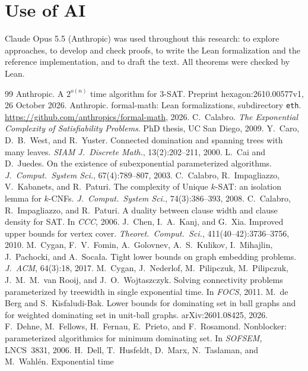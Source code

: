 \documentclass[11pt]{article}
\theoremstyle{remark}
\begin{document}
\section*{Use of AI}

Claude Opus 5.5 (Anthropic) was used throughout this research: to explore approaches, to develop
and check proofs, to write the Lean formalization and the reference implementation, and to draft
the text. All theorems were checked by Lean.

\begin{thebibliography}{99}
 Anthropic. A $2^{o(n)}$ time algorithm for 3-SAT. Preprint hexagon:2610.00577v1,
  26 October 2026.
 Anthropic. formal-math: Lean formalizations, subdirectory \texttt{eth}.
  \url{https://github.com/anthropics/formal-math}, 2026.
 C.~Calabro. \emph{The Exponential Complexity of Satisfiability Problems}.
  PhD thesis, UC San Diego, 2009.
 Y.~Caro, D.~B.~West, and R.~Yuster. Connected domination and spanning trees with
  many leaves. \emph{SIAM J.\ Discrete Math.}, 13(2):202--211, 2000.
 L.~Cai and D.~Juedes. On the existence of subexponential parameterized algorithms.
  \emph{J.\ Comput.\ System Sci.}, 67(4):789--807, 2003.
 C.~Calabro, R.~Impagliazzo, V.~Kabanets, and R.~Paturi. The complexity of Unique
  $k$-SAT: an isolation lemma for $k$-CNFs. \emph{J.\ Comput.\ System Sci.}, 74(3):386--393, 2008.
 C.~Calabro, R.~Impagliazzo, and R.~Paturi. A duality between clause width and
  clause density for SAT. In \emph{CCC}, 2006.
 J.~Chen, I.~A.~Kanj, and G.~Xia. Improved upper bounds for vertex cover.
  \emph{Theoret.\ Comput.\ Sci.}, 411(40--42):3736--3756, 2010.
 M.~Cygan, F.~V.~Fomin, A.~Golovnev, A.~S.~Kulikov, I.~Mihajlin, J.~Pachocki,
  and A.~Soca{\l}a. Tight lower bounds on graph embedding problems. \emph{J.\ ACM}, 64(3):18, 2017.
 M.~Cygan, J.~Nederlof, M.~Pilipczuk, M.~Pilipczuk, J.~M.~M.~van Rooij, and
  J.~O.~Wojtaszczyk. Solving connectivity problems parameterized by treewidth in single exponential
  time. In \emph{FOCS}, 2011.
 M.~de Berg and S.~Kisfaludi-Bak. Lower bounds for dominating set in ball graphs and
  for weighted dominating set in unit-ball graphs. arXiv:2601.08425, 2026.
 F.~Dehne, M.~Fellows, H.~Fernau, E.~Prieto, and F.~Rosamond. Nonblocker:
  parameterized algorithmics for minimum dominating set. In \emph{SOFSEM}, LNCS~3831, 2006.
 H.~Dell, T.~Husfeldt, D.~Marx, N.~Taslaman, and M.~Wahl\'en. Exponential time

\end{thebibliography}
\end{document}
